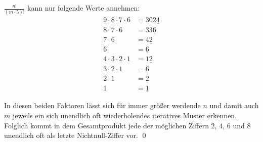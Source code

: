$\frac{n!}{(m\cdot5)!}$ kann nur folgende Werte annehmen:
\begin{equation*}
	\begin{split}
		9\cdot8\cdot7\cdot6 &= 302\underline{4} \\
		8\cdot7\cdot6 &= 33\underline{6} \\
		7\cdot6 &= 4\underline{2} \\
		6 &= \underline{6} \\
		4\cdot3\cdot2\cdot1 &= 1\underline{2} \\
		3\cdot2\cdot1 &= \underline{6} \\
		2\cdot1 &= \underline{2} \\
		1 &= \underline{1}
	\end{split}
\end{equation*}

In diesen beiden Faktoren lässt sich für immer größer werdende $n$ und damit auch $m$ jeweils ein sich unendlich oft wiederholendes iteratives Muster erkennen. Folglich kommt in dem Gesamtprodukt jede der möglichen Ziffern $2$, $4$, $6$ und $8$ unendlich oft als letzte Nichtnull-Ziffer vor. \qed
